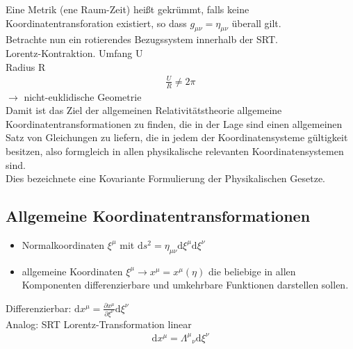 \documentclass[a4paper]{article}
\begin{document}
Eine Metrik (ene Raum-Zeit) heißt gekrümmt, falls keine
Koordinatentransforation existiert, so dass
$g_{\mu\nu}=\eta_{\mu\nu}$ überall gilt.\\
Betrachte nun ein rotierendes Bezugssystem innerhalb der SRT.\\
Lorentz-Kontraktion.
Umfang U\\
Radius R\\
\begin{align}
\frac{U}{R}\neq2\pi
\end{align}
$\rightarrow$ nicht-euklidische Geometrie\\
Damit ist das Ziel der allgemeinen Relativitätstheorie allgemeine
Koordinatentransformationen zu finden, die in der Lage sind einen allgemeinen
Satz von Gleichungen zu liefern, die in jedem der Koordinatensysteme gültigkeit
besitzen, also formgleich in allen physikalische relevanten Koordinatensystemen
sind.\\
Dies bezeichnete eine Kovariante Formulierung der Physikalischen Gesetze.
\subsection{Allgemeine Koordinatentransformationen}
\begin{itemize}
  \item Normalkoordinaten $\xi^\mu$ mit $\mathrm{d}s^2=\eta_{\mu\nu}\mathrm{d}
\xi^\mu\mathrm{d}\xi^\nu$ 
\item allgemeine Koordinaten $\xi^\mu\rightarrow x^\mu=x^\mu(\eta)$ die
beliebige in allen Komponenten differenzierbare und umkehrbare Funktionen
darstellen sollen.   
\end{itemize}
Differenzierbar: $\mathrm{d}x^\mu=\frac{\partial x^\mu}{\partial
\xi^\nu}\mathrm{d}\xi^\nu$\\
Analog: SRT Lorentz-Transformation linear
\begin{align}
\mathrm{d}x^\mu=\Lambda^\mu{}_\nu \mathrm{d}\xi^\nu
\end{align}
\end{document}

